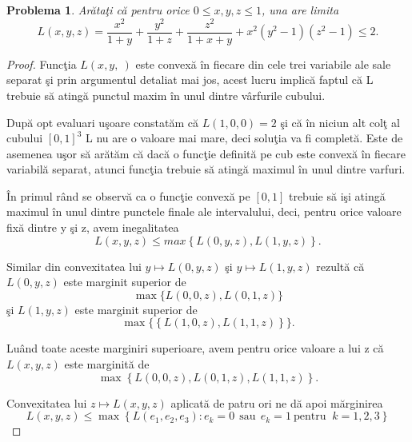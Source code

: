 \documentclass[a4paper,12pt,oneside]{report}
\newtheorem{problem}{Problema}
\begin{document}
\begin{problem}
  Ar\u{a}ta\c{t}i c\u{a} pentru orice \(0\leq x , y , z \leq 1\), una are limita
\begin{displaymath}
  L\left ( x , y , z \right ) = \frac{x^{2}}{1 + y} + \frac{y^{2}}{1 + z} + \frac{z^{2}}{1 + x+ y} + x^{2} \left ( y^{2} - 1 \right )\left ( z^{2} - 1 \right ) \leq 2.
\end{displaymath}
\end{problem}
\begin{proof}
Func\c{t}ia \(L\left ( x,y,\ \right )\) este convex\u{a} \^{i}n fiecare din cele trei variabile ale sale separat \c{s}i prin argumentul detaliat mai jos, acest lucru implic\u{a} faptul c\u{a} L trebuie s\u{a} ating\u{a} punctul maxim  \^{i}n unul dintre v\^{a}rfurile cubului.

Dup\u{a} opt evaluari u\c{s}oare constat\u{a}m c\u{a} \(L \left ( 1,0,0 \right ) = 2\) \c{s}i c\u{a} \^{i}n niciun alt col\c{t} al cubului $[0, 1]^3$ L nu are o valoare mai mare, deci solu\c{t}ia va fi complet\u{a}. Este de asemenea u\c{s}or s\u{a} ar\u{a}t\u{a}m c\u{a} dac\u{a} o func\c{t}ie definit\u{a} pe cub este convex\u{a} \^{i}n fiecare variabil\u{a} separat, atunci func\c{t}ia trebuie s\u{a} ating\u{a} maximul \^{i}n unul dintre varfuri.

\^{I}n primul r\^{a}nd se observ\u{a} ca o func\c{t}ie convex\u{a} pe \(\left [ 0 , 1 \right ]\) trebuie s\u{a} i\c{s}i ating\u{a} maximul \^{i}n unul dintre punctele finale ale intervalului, deci, pentru orice valoare fix\u{a} dintre y \c{s}i z, avem inegalitatea
\begin{displaymath}
  L\left ( x,y,z \right )\leq max \left \{ L\left ( 0,y,z \right ), L\left ( 1,y,z \right ) \right \}.
\end{displaymath}

 Similar din convexitatea lui \(y \mapsto L\left ( 0,y,z \right )\) \c{s}i \(y \mapsto L\left ( 1,y,z \right )\)  rezult\u{a} c\u{a} \(L\left ( 0, y, z \right )\) este marginit superior de  \[\max \{L\left ( 0,0,z \right ), L\left ( 0,1,z \right )\}\] \c{s}i \( L\left ( 1,y,z \right )\) este marginit superior de \[\max \{\left \{ L\left ( 1,0,z \right ) , L \left ( 1,1,z \right )\right \}\}.\]

 Lu\^{a}nd toate aceste marginiri superioare, avem pentru orice valoare a lui z c\u{a} \(L\left ( x,y,z \right )\) este marginit\u{a} de
 \[\max\left \{ L\left ( 0,0,z \right ), L\left ( 0,1,z \right ), L\left ( 1,1,z \right ) \right \}.\]

 Convexitatea lui \(z \mapsto L\left ( x,y,z \right )\) aplicat\u{a} de patru ori ne d\u{a} apoi m\u{a}rginirea
 \begin{displaymath}
  L\left ( x,y,z \right ) \leq  \max \left \{ L\left ( e_{1} , e_{2}, e_{3}\right ): e_{k}  = 0 ~~\text{sau}~~ e_{k} = 1 ~\text{pentru }~ k = 1,2,3\right \}
\end{displaymath}
\end{proof}
\end{document}
